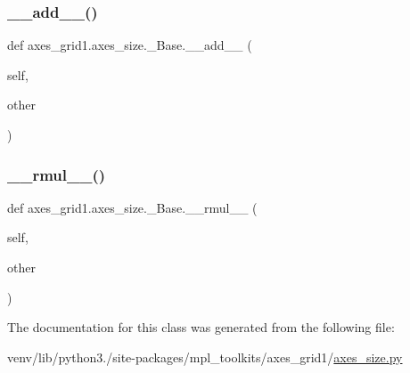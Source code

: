 \subsubsection{\texorpdfstring{\+\_\+\+\_\+add\+\_\+\+\_\+()}{\_\_add\_\_()}}
{\footnotesize\ttfamily def axes\+\_\+grid1.\+axes\+\_\+size.\+\_\+\+Base.\+\_\+\+\_\+add\+\_\+\+\_\+ (\begin{DoxyParamCaption}\item[{}]{self,  }\item[{}]{other }\end{DoxyParamCaption})}

\mbox{\label{classaxes__grid1_1_1axes__size_1_1__Base_a6fa8ca5ff6b309e56698845eebd79633}} 
\subsubsection{\texorpdfstring{\+\_\+\+\_\+rmul\+\_\+\+\_\+()}{\_\_rmul\_\_()}}
{\footnotesize\ttfamily def axes\+\_\+grid1.\+axes\+\_\+size.\+\_\+\+Base.\+\_\+\+\_\+rmul\+\_\+\+\_\+ (\begin{DoxyParamCaption}\item[{}]{self,  }\item[{}]{other }\end{DoxyParamCaption})}



The documentation for this class was generated from the following file\+:\begin{DoxyCompactItemize}
\item 
venv/lib/python3./site-\/packages/mpl\+\_\+toolkits/axes\+\_\+grid1/\hyperlink{_2axes__size_8py}{axes\+\_\+size.\+py}\end{DoxyCompactItemize}
